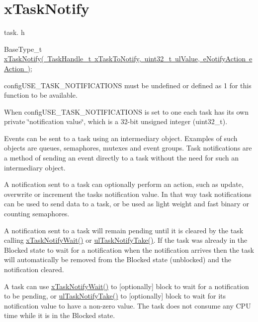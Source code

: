 \hypertarget{group__x_task_notify}{}\section{x\+Task\+Notify}
\label{group__x_task_notify}
task. h 
\begin{DoxyPre}BaseType\_t \mbox{\hyperlink{task_8h_a0d2d54fb8a64011dfbb54983e4ed06bd}{xTaskNotify( TaskHandle\_t xTaskToNotify, uint32\_t ulValue, eNotifyAction eAction )}};\end{DoxyPre}


config\+U\+S\+E\+\_\+\+T\+A\+S\+K\+\_\+\+N\+O\+T\+I\+F\+I\+C\+A\+T\+I\+O\+NS must be undefined or defined as 1 for this function to be available.

When config\+U\+S\+E\+\_\+\+T\+A\+S\+K\+\_\+\+N\+O\+T\+I\+F\+I\+C\+A\+T\+I\+O\+NS is set to one each task has its own private \char`\"{}notification value\char`\"{}, which is a 32-\/bit unsigned integer (uint32\+\_\+t).

Events can be sent to a task using an intermediary object. Examples of such objects are queues, semaphores, mutexes and event groups. Task notifications are a method of sending an event directly to a task without the need for such an intermediary object.

A notification sent to a task can optionally perform an action, such as update, overwrite or increment the task\textquotesingle{}s notification value. In that way task notifications can be used to send data to a task, or be used as light weight and fast binary or counting semaphores.

A notification sent to a task will remain pending until it is cleared by the task calling \mbox{\hyperlink{task_8h_a0475fcda9718f403521c270a7270ff93}{x\+Task\+Notify\+Wait()}} or \mbox{\hyperlink{task_8h_a66540bef602522a01a519f776e4c07d8}{ul\+Task\+Notify\+Take()}}. If the task was already in the Blocked state to wait for a notification when the notification arrives then the task will automatically be removed from the Blocked state (unblocked) and the notification cleared.

A task can use \mbox{\hyperlink{task_8h_a0475fcda9718f403521c270a7270ff93}{x\+Task\+Notify\+Wait()}} to \mbox{[}optionally\mbox{]} block to wait for a notification to be pending, or \mbox{\hyperlink{task_8h_a66540bef602522a01a519f776e4c07d8}{ul\+Task\+Notify\+Take()}} to \mbox{[}optionally\mbox{]} block to wait for its notification value to have a non-\/zero value. The task does not consume any C\+PU time while it is in the Blocked state.


